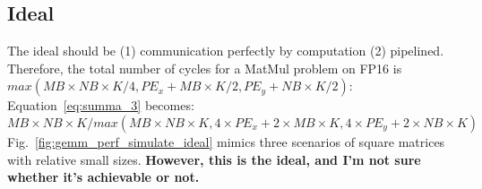 

\subsection{Ideal}


The ideal \summa should be (1) communication perfectly by computation (2) pipelined.
%
Therefore, the total number of cycles for a MatMul problem on FP16 is $max(MB \times NB \times K / 4, PE_x + MB \times K/2,  PE_y + NB \times K/2)$:
Equation~\ref{eq:summa_3} becomes:
\begin{equation}
  MB \times NB \times K/max(MB \times NB \times K, 4 \times PE_x + 2 \times MB \times K, 4 \times PE_y + 2 \times NB \times K)
  \label{eq:summa_7}
\end{equation}
%
Fig.~\ref{fig:gemm_perf_simulate_ideal} mimics three scenarios of square matrices with relative small sizes.
%
{\bf However, this is the ideal, and I'm not sure whether it's achievable or not.}


